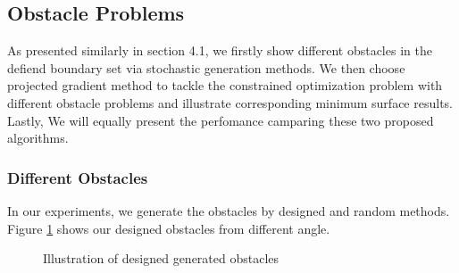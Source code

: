 \subsection{Obstacle Problems}
As presented similarly in section 4.1, we firstly show different obstacles in the defiend boundary set via stochastic generation methods. We then choose projected gradient method to tackle the constrained optimization problem with different obstacle problems and illustrate corresponding minimum surface results. Lastly, We will equally present the perfomance camparing these two proposed algorithms. 
\subsubsection{Different Obstacles}
In our experiments, we generate the obstacles by designed and random methods. Figure \ref{fig:desined} shows our designed obstacles from different angle.

\begin{figure}[!htbp]
    \centering
    \caption{Illustration of designed generated obstacles}
    \label{fig:desined}  
\end{figure}


